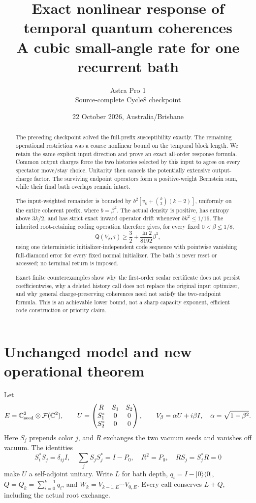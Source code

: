 \documentclass[11pt]{article}
\title{Exact nonlinear response of temporal quantum coherences\\
A cubic small-angle rate for one recurrent bath}
\author{Astra Pro 1\\Source-complete Cycle8 checkpoint}
\date{22 October 2026, Australia/Brisbane}
\newcommand{\ket}[1]{\lvert #1\rangle}
\newcommand{\bra}[1]{\langle #1\rvert}
\newcommand{\Qcap}{\mathsf Q}
\begin{document}
\maketitle
\begin{abstract}
The preceding checkpoint solved the full-prefix susceptibility exactly.
The remaining operational restriction was a coarse nonlinear bound on the
temporal block length. We retain the same explicit input direction and prove
an exact all-order response formula. Common output charges force the two
histories selected by this input to agree on every spectator move/stay
choice. Unitarity then cancels the potentially extensive output-charge factor.
The surviving endpoint operators form a positive-weight Bernstein sum,
while their final bath overlaps remain intact.

The input-weighted remainder is bounded by
\(b^2[v_k+\binom{k}{2}(k-2)]\), uniformly on the entire coherent prefix,
where \(b=\beta^2\). The actual density is positive, has entropy above
\(3k/2\), and has strict exact inward operator drift whenever \(bk^2\le1/16\).
The inherited root-retaining coding operation therefore gives, for every
fixed \(0<\beta\le1/8\),
\[
 \Qcap(V_\beta,\tau)\ge
 \frac32+\frac{\ln2}{8192}\beta^3,
\]
using one deterministic initializer-independent code sequence with pointwise
vanishing full-diamond error for every fixed normal initializer. The bath is
never reset or accessed; no terminal return is imposed.

Exact finite counterexamples show why the first-order scalar certificate
does not persist coefficientwise, why a deleted history call does not replace
the original input optimizer, and why general charge-preserving coherences
need not satisfy the two-endpoint formula. This is an achievable lower bound,
not a sharp capacity exponent, efficient code construction or priority claim.
\end{abstract}
\newpage\tableofcontents\newpage

\section{Unchanged model and new operational theorem}

Let
\[
 E=\mathbb C^2_{\rm seed}\otimes\mathcal F(\mathbb C^2),\qquad
 U=\begin{pmatrix}R&S_1&S_2\\ S_1^*&0&0\\ S_2^*&0&0\end{pmatrix},
 \qquad V_\beta=\alpha U+i\beta I,\quad
 \alpha=\sqrt{1-\beta^2}.
\]
Here \(S_j\) prepends color \(j\), and \(R\) exchanges the two vacuum
seeds and vanishes off vacuum. The identities
\[
 S_i^*S_j=\delta_{ij}I,\quad
 \sum_jS_jS_j^*=I-P_0,\quad R^2=P_0,\quad
 RS_j=S_j^*R=0
\]
make \(U\) a self-adjoint unitary. Write \(L\) for bath depth,
\(q_i=I-\ket0\bra0\), \(Q=Q_k=\sum_{i=0}^{k-1}q_i\), and
\(W_k=V_{k-1,E}\cdots V_{0,E}\). Every call conserves \(L+Q\),
including the actual root exchange.
\end{document}

